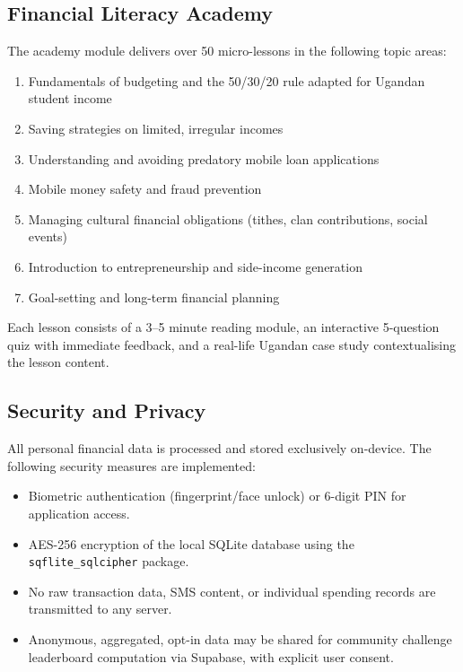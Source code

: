 \documentclass[12pt]{report}
\begin{document}
\subsection{Financial Literacy Academy}

The academy module delivers over 50 micro-lessons in the following topic areas:

\begin{enumerate}
    \item Fundamentals of budgeting and the 50/30/20 rule adapted for Ugandan student income
    \item Saving strategies on limited, irregular incomes
    \item Understanding and avoiding predatory mobile loan applications
    \item Mobile money safety and fraud prevention
    \item Managing cultural financial obligations (tithes, clan contributions, social events)
    \item Introduction to entrepreneurship and side-income generation
    \item Goal-setting and long-term financial planning
\end{enumerate}

Each lesson consists of a 3--5 minute reading module, an interactive 5-question quiz
with immediate feedback, and a real-life Ugandan case study contextualising the lesson
content.

\subsection{Security and Privacy}

All personal financial data is processed and stored exclusively on-device. The
following security measures are implemented:

\begin{itemize}
    \item Biometric authentication (fingerprint/face unlock) or 6-digit PIN for application access.
    \item AES-256 encryption of the local SQLite database using the \texttt{sqflite\_sqlcipher} package.
    \item No raw transaction data, SMS content, or individual spending records are transmitted to any server.
    \item Anonymous, aggregated, opt-in data may be shared for community challenge leaderboard computation via Supabase, with explicit user consent.
\end{itemize}
\end{document}
